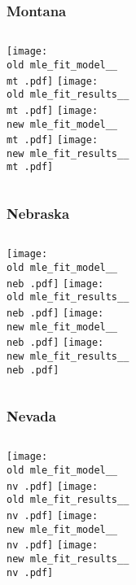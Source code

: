 \documentclass{beamer}
\newcommand{\old}{current_two_stage_output/pyseir/state_summaries/reports/}
\newcommand{\new}{new_shortest_t_delta/pyseir/state_summaries/reports/}
\newcommand{\mt}{Montana__30}
\newcommand{\neb}{Nebraska__31}
\newcommand{\nv}{Nevada__32}
\begin{document}
\begin{frame}
\frametitle{Montana}
    \begin{columns}[t]

       \texttt{[image: \\old mle\_fit\_model\_\_\\mt .pdf]}
       \texttt{[image: \\old mle\_fit\_results\_\_\\mt .pdf]}   
       \texttt{[image: \\new mle\_fit\_model\_\_\\mt .pdf]}
       \texttt{[image: \\new mle\_fit\_results\_\_\\mt .pdf]}   
\end{columns}
\end{frame}

\begin{frame}
\frametitle{Nebraska}
    \begin{columns}[t]

       \texttt{[image: \\old mle\_fit\_model\_\_\\neb .pdf]}
       \texttt{[image: \\old mle\_fit\_results\_\_\\neb .pdf]}   
       \texttt{[image: \\new mle\_fit\_model\_\_\\neb .pdf]}
       \texttt{[image: \\new mle\_fit\_results\_\_\\neb .pdf]}   
\end{columns}
\end{frame}

\begin{frame}
\frametitle{Nevada}
    \begin{columns}[t]

       \texttt{[image: \\old mle\_fit\_model\_\_\\nv .pdf]}
       \texttt{[image: \\old mle\_fit\_results\_\_\\nv .pdf]}   
       \texttt{[image: \\new mle\_fit\_model\_\_\\nv .pdf]}
       \texttt{[image: \\new mle\_fit\_results\_\_\\nv .pdf]}   
\end{columns}
\end{frame}
\end{document}
